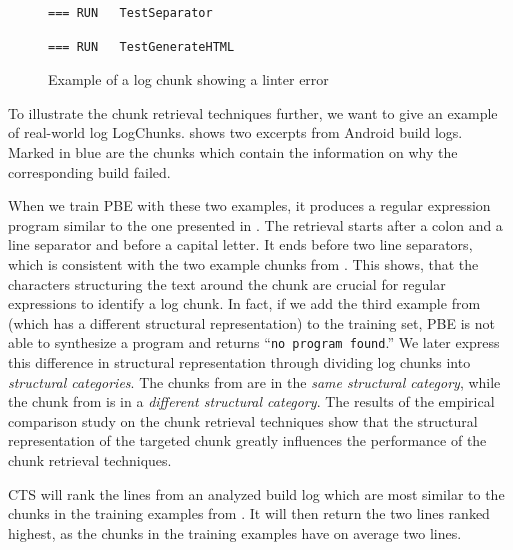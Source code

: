 \begin{figure}[tbp]
  \centering
  \begin{lstlisting}[breaklines=true,frame=tlr]
=== RUN   TestSeparator
  \end{lstlisting}
  \vspace{-\baselineskip}
  
  \vspace{-\baselineskip}
  \begin{lstlisting}[breaklines=true,frame=blr]
=== RUN   TestGenerateHTML
  \end{lstlisting}
  \caption{Example of a log chunk showing a linter error}
  \label{lst:chunk-example-3}
\end{figure}

To illustrate the chunk retrieval techniques further, we want to give
an example of real-world log LogChunks.
 shows two excerpts
from Android build logs.
Marked in blue are the chunks
which contain the information on why the
corresponding build failed.

When we train PBE with these two examples, it produces
a regular expression program similar to the one presented in
.
The retrieval
starts after a colon and a line separator and before a capital
letter.
It ends before two line separators,
which is consistent with the two example
chunks from .
This shows, that the characters structuring the text around the chunk are
crucial for regular expressions to identify a log chunk.
In fact, if we add the third example from 
(which has a
different structural representation) to the training set,
PBE is not able to synthesize a program and returns
``\texttt{no program found}.''
We later express this difference in structural representation through
dividing log chunks into \emph{structural categories}.
The chunks from 
are in the \emph{same structural category}, while the chunk from
 is in a
\emph{different structural category}.
The results of the empirical comparison study on the chunk retrieval
techniques
show that the structural representation of the targeted chunk greatly
influences
the performance of the chunk retrieval techniques.

CTS will rank the lines from an analyzed build log which are most
similar to the chunks in the training examples
from .
It will then return the two lines ranked highest, as the chunks in
the training examples have on average two lines.

